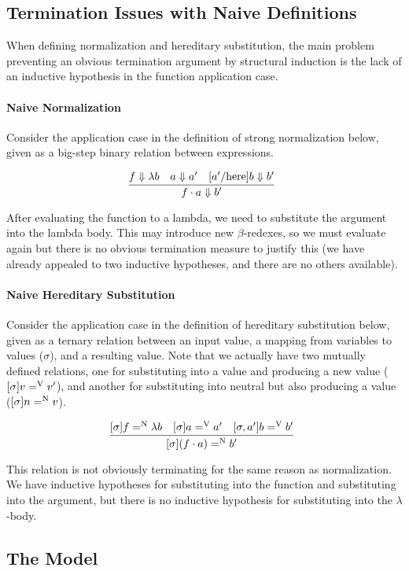 \documentclass{llncs}
\def\bigstep{\Downarrow}
\def\app{\cdot}
\def\lam{\lambda}
\newcommand{\hsubn}[2]{[\sigma]#1=^\con{N}#2}
\newcommand{\hsub}[2]{[\sigma]#1=^\con{V}#2}
\newcommand{\hsubext}[3]{[\sigma, #1]#2=^\con{V}#3}
\newcommand{\con}[1]{\textmd{#1}}
\begin{document}
\subsection{Termination Issues with Naive Definitions}

When defining normalization and hereditary substitution, the
main problem preventing an obvious termination
argument by structural induction is the lack of
an inductive hypothesis in the function application case.

\paragraph{Naive Normalization}
Consider the application case in the definition of strong normalization
below, given as a big-step binary relation between expressions.

$$
\infer
  []{f \app a \bigstep {b'}}
{
  f \bigstep \lam b
  &
  a \bigstep a'
  &
  [a'/\con{here}]b \bigstep b'
}
$$

After evaluating the function to a lambda, we need to
substitute the argument into the lambda body. This may introduce
new $\beta$-redexes, so we must evaluate again but
there is no obvious termination measure to justify this (we have
already appealed to two inductive hypotheses, and there are no others
available).

\paragraph{Naive Hereditary Substitution}
Consider the application case in the definition of hereditary substitution
below, given as a ternary relation between an input value, a mapping from
variables to values ($\sigma$), and a resulting value. Note that we
actually have two mutually defined relations, one for substituting
into a value and producing a new value ($\hsub{v}{v'}$), and another
for substituting into neutral but also producing a value
($\hsubn{n}{v}$).

$$
\infer
   []{\hsubn{(f \app a)}{b'}}
{
  \hsubn{f}{\lam b}
  &
  \hsub{a}{a'}
  &
  \hsubext{a'}{b}{b'}
}
$$

This relation is not obviously terminating for the same reason as
normalization. We have inductive hypotheses for substituting into the
function and substituting into the argument, but there is no inductive hypothesis for
substituting into the $\lambda$-body.

\subsection{The Model}
\end{document}
